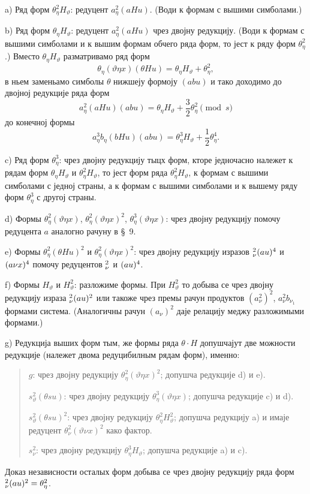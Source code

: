 ﻿\documentclass[11pt]{article}
\let\A\relax
\newcommand{\A}{\mathfrak A}
\begin{document}
\noindent\mbox{a)} Ряд форм $\theta_\eta^2H_\vartheta$: редуцент $a_\eta^2(aHu)$. (Води к формам с вышими симболами.)

\noindent\mbox{b)} Ряд форм $\theta_\eta H_\vartheta$: редуцент $a_\eta^2(aHu)$ чрез двојну редукцију. (Води к формам с вышими симболами и к вышим формам обчего ряда форм, то јест к ряду форм $\theta_\eta^2$.) Вместо $\theta_\eta H_\vartheta$ разматривамо ряд форм
\[
\theta_\eta(\vartheta\eta x)(\theta Hu)=\theta_\eta H_\vartheta+\theta_\eta^2,
\]
в ньем заменьамо симболы $\theta$ нижшеју формоју $(abu)$ и тако доходимо до двојној редукције ряда форм
\[
a_\eta^2(aHu)(abu)=\theta_\eta H_\vartheta+\frac32\theta_\eta^2\pmod{s}
\]
до конечној формы
\[
a_\eta^3b_\eta(bHu)(abu)=\theta_\eta^3H_\vartheta+\frac12\theta_\eta^4.
\]

\noindent\mbox{c)} Ряд форм $\theta_\eta^3$: чрез двојну редукцију тыцх форм, кторе једночасно належет к рядам форм $\theta_\eta H_\vartheta$ и $\theta_\eta^2H_\vartheta$, то јест форм ряда $\theta_\eta^2H_\vartheta$, к формам с вышими симболами с једној страны, а к формам с вышими симболами и к вышему ряду форм $\theta_\eta^3$ с другој страны.

\noindent\mbox{d)} Формы $\theta_\eta^2(\vartheta\eta x)$, $\theta_\eta^2(\vartheta\eta x)^2$, $\theta_\eta^3(\vartheta\eta x)$: чрез двојну редукцију помочу редуцента $a$ аналогно рачуну в \S\ 9.

\noindent\mbox{e)} Формы $\theta_\eta^2(\theta Hu)^2$ и $\theta_\eta^2(\vartheta\eta x)^2$: чрез двојну редукцију изразов $\A_\nu^2(a\A u)^4$ и $(a\A\nu x)^4$ помочу редуцентов $\A_\nu^2$ и $(a\A u)^4$.

\noindent\mbox{f)} Формы $H_\vartheta$ и $H_\vartheta^2$: разложиме формы. При $H_\vartheta^2$ то добыва се чрез двојну редукцију израза $\A_\nu^2(a\A u)^2$ или такоже чрез премы рачун продуктов $(a_\nu^2)^2$, $a_\nu^2b_{\nu_1}$ формами система. (Аналогичны рачун $(a_\nu)^2$ даје релацију меджу разложимыми формами.)

\noindent\mbox{g)} Редукција выших форм тым, же формы ряда $\theta\cdot H$ допушчајут две можности редукције (належет двома редуцибилным рядам форм), именно:
\begin{quote}\small
$g$: чрез двојну редукцију $\theta_\eta^2(\vartheta\eta x)^2$; допушча редукције \mbox{d)} и \mbox{e)}.\par
$s_\vartheta^2(\theta su)$: чрез двојну редукцију $\theta_\eta^3(\vartheta\eta x)$; допушча редукције \mbox{c)} и \mbox{d)}.\par
$s_\vartheta^2(\theta su)^2$: чрез двојну редукцију $\theta_\eta^2H_\vartheta^2$; допушча редукцију \mbox{a)} и имаје редуцент $\theta_\nu^2(\vartheta\nu x)^2$ како фактор.\par
$s_\nu^2$: чрез двојну редукцију $\theta_\eta^3H_\vartheta$; допушча редукције \mbox{a)} и \mbox{c)}.
\end{quote}
Доказ независности осталых форм добыва се чрез двојну редукцију ряда форм $\A_\nu^2(a\A u)^2=\theta_\eta^2$.
\end{document}
